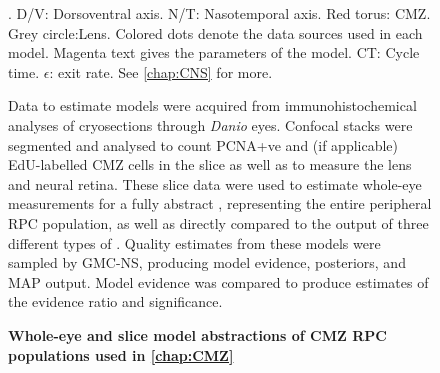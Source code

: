 \documentclass{ut-thesis}
\begin{document}
\begin{NoHyper}
\begin{figure}[!h]
    \caption{{\bf Whole-eye and slice model abstractions of CMZ RPC populations used in \autoref{chap:CMZ}}}.
    \label{cmzslice}
    D/V: Dorsoventral axis. N/T: Nasotemporal axis. Red torus: CMZ. Grey circle:Lens. Colored dots denote the data sources used in each model. Magenta text gives the parameters of the model. CT: Cycle time. $\epsilon$: exit rate. See \autoref{chap:CNS} for more.

    Data to estimate models were acquired from immunohistochemical analyses of cryosections through \textit{Danio} eyes. Confocal stacks were segmented and analysed to count PCNA+ve and (if applicable) EdU-labelled CMZ cells in the slice as well as to measure the lens and neural retina. These slice data were used to estimate whole-eye measurements for a fully abstract , representing the entire peripheral RPC population, as well as directly compared to the output of three different types of . Quality estimates from these models were sampled by GMC-NS, producing model evidence, posteriors, and MAP output. Model evidence was compared to produce estimates of the evidence ratio and significance.
\end{figure}



\end{NoHyper}
\end{document}
